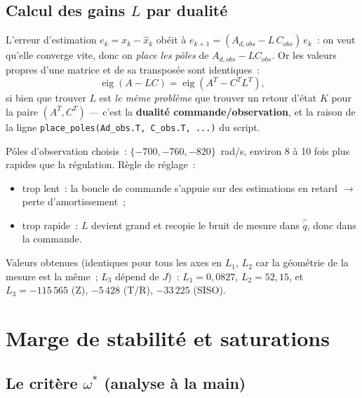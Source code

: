 \documentclass[a4paper,11pt]{article}
\begin{document}
\subsection{Calcul des gains $L$ par dualité}

L'erreur d'estimation $e_k = x_k - \hat{x}_k$ obéit à
$e_{k+1} = (A_{d,obs} - L\,C_{obs})\,e_k$~: on veut qu'elle converge vite,
donc on \emph{place les pôles} de $A_{d,obs} - L C_{obs}$. Or les valeurs
propres d'une matrice et de sa transposée sont identiques~:
\begin{equation}
    \operatorname{eig}(A - LC) = \operatorname{eig}(A^T - C^T L^T),
\end{equation}
si bien que trouver $L$ est \emph{le même problème} que trouver un retour
d'état $K$ pour la paire $(A^T, C^T)$ --- c'est la \textbf{dualité
commande/observation}, et la raison de la ligne
\texttt{place\_poles(Ad\_obs.T, C\_obs.T, ...)} du script.

Pôles d'observation choisis~: $\{-700, -760, -820\}$~rad/s, environ 8 à 10
fois plus rapides que la régulation. Règle de réglage~:
\begin{itemize}
    \item trop lent~: la boucle de commande s'appuie sur des estimations en
          retard $\to$ perte d'amortissement~;
    \item trop rapide~: $L$ devient grand et recopie le bruit de mesure dans
          $\hat{\dot q}$, donc dans la commande.
\end{itemize}
Valeurs obtenues (identiques pour tous les axes en $L_1$, $L_2$ car la
géométrie de la mesure est la même~; $L_3$ dépend de $J$)~:
$L_1 = 0{,}0827$, $L_2 = 52{,}15$, et $L_3 = -115\,565$ (Z), $-5\,428$ (T/R),
$-33\,225$ (SISO).

\section{Marge de stabilité et saturations}
\label{sec:marge}

\subsection{Le critère $\omega^{*}$ (analyse à la main)}
\end{document}
